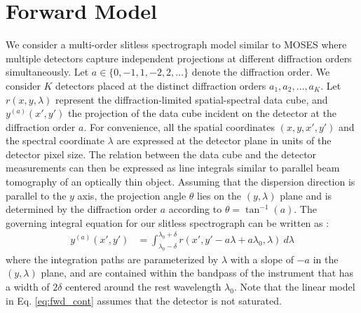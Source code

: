 \documentclass[linenumbers,twocolumn]{aastex7}
\begin{document}
\section{Forward Model} \label{sec:par_fwd_mod}
We consider a multi-order slitless spectrograph model similar to MOSES
\citep{kankelborg2001simultaneous} where multiple detectors capture independent
projections at different diffraction orders simultaneously. Let $a \in
\{0,-1,1,-2,2,\dots\}$ denote the diffraction order. We consider $K$ detectors
placed at the distinct diffraction orders $a_1, a_2, \dots, a_K$.  Let
$r(x,y,\lambda)$ represent the diffraction-limited spatial-spectral data cube,
and $y^{(a)} (x',y')$ the projection of the data cube incident on the detector
at the diffraction order $a$.  For convenience, all the spatial coordinates
$(x,y,x',y')$ and the spectral coordinate $\lambda$ are expressed at the
detector plane in units of the detector pixel size.  The relation between the
data cube and the detector measurements can then be expressed as line integrals
similar to parallel beam tomography of an optically thin object.  Assuming that
the dispersion direction is parallel to the $y$ axis, the projection
angle $\theta$ lies on the $(y,\lambda)$ plane and is determined by the
diffraction order $a$ according to $\theta = \tan^{-1}(a)$.  The governing
integral equation for our slitless spectrograph can be written as
\citep{kankelborg2001simultaneous}:
\begin{align}
    y^{(a)}(x',y') & = \int_{\lambda_0-\delta}^{\lambda_0+\delta} r(x', y' -
    a\lambda+a\lambda_0,\lambda) \ d\lambda 
\label{eq:fwd_cont}
\end{align}
where the integration paths are parameterized by $\lambda$ with a slope of $-a$ 
in the $(y,\lambda)$ plane, and are contained within the bandpass of the
instrument that has a width of $2 \delta$ centered around the rest wavelength
$\lambda_0$. Note that the linear model in Eq. \eqref{eq:fwd_cont} 
assumes that the detector is not saturated.
\end{document}
